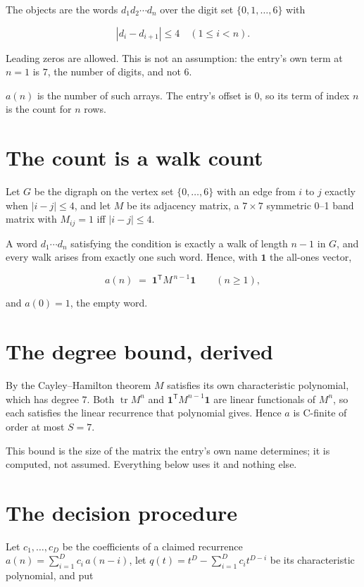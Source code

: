 \documentclass[11pt]{article}
\theoremstyle{definition}
\begin{document}
The objects are the words $d_1 d_2 \cdots d_n$ over the digit set $\{0,1,\dots,6\}$ with

\[|d_i - d_{i+1}| \le 4\quad (1 \le i < n).\]

Leading zeros are allowed. This is not an assumption: the entry's own term at $n=1$ is $7$, the number of digits, and not $6$.

$a(n)$ is the number of such arrays. The entry's offset is 0, so its term of index $n$ is the count for $n$ rows.

\section{The count is a walk count}

Let $G$ be the digraph on the vertex set $\{0,\dots,6\}$ with an edge from $i$ to $j$ exactly when $|i-j| \le 4$, and let $M$ be its adjacency matrix, a $7 \times 7$ symmetric 0--1 band matrix with $M_{ij} = 1$ iff $|i-j| \le 4$.

A word $d_1\cdots d_n$ satisfying the condition is exactly a walk of length $n-1$ in $G$, and every walk arises from exactly one such word. Hence, with $\mathbf 1$ the all-ones vector,

\[a(n) \;=\; \mathbf 1^{\mathsf T} M^{\,n-1} \mathbf 1 \qquad (n \ge 1),\]

and $a(0) = 1$, the empty word.

\section{The degree bound, derived}

By the Cayley--Hamilton theorem $M$ satisfies its own characteristic polynomial, which has degree $7$. Both $\operatorname{tr} M^n$ and $\mathbf 1^{\mathsf T} M^{n-1} \mathbf 1$ are linear functionals of $M^{n}$, so each satisfies the linear recurrence that polynomial gives. Hence $a$ is C-finite of order at most $S = 7$.

This bound is the size of the matrix the entry's own name determines; it is computed, not assumed. Everything below uses it and nothing else.

\section{The decision procedure}

Let $c_1,\dots,c_D$ be the coefficients of a claimed recurrence $a(n) = \sum_{i=1}^{D} c_i\,a(n-i)$, let $q(t) = t^{D} - \sum_{i=1}^{D} c_i t^{D-i}$ be its characteristic polynomial, and put
\end{document}

